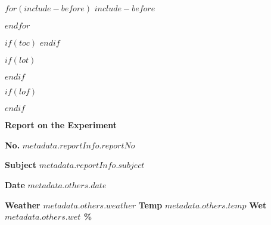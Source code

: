 \documentclass[12pt,a4paper,$if(lang)$$babel-lang$,$endif$]{ltjsarticle}
\begin{document}

$for(include-before)$
$include-before$

$endfor$

$if(toc)$
{
\hypersetup{linkcolor=$if(toccolor)$$toccolor$$else$black$endif$}
\setcounter{tocdepth}{$toc-depth$}
\tableofcontents
}
$endif$

$if(lot)$
\listoftables
$endif$

$if(lof)$
\listoffigures
$endif$

\newenvironment{boldtabular}{ \arrayrulewidth = 2pt }{}
\newenvironment{narrowtabular}{ \renewcommand{\arraystretch}{0.8} }{}
\newenvironment{titletabular}{ \renewcommand{\arraystretch}{1.1} }{}
\newenvironment{datetabular}{ \renewcommand{\arraystretch}{1.1} }{}
\newenvironment{templaturetabular}{ \renewcommand{\arraystretch}{1.18} }{}
\newenvironment{report-title}{
\centering
  \fontsize{20pt}{20pt}\selectfont
}{}
\fontsize{14pt}{28pt}\selectfont

\begin{center}
  \begin{report-title}
    \textbf{Report on the Experiment}
  \end{report-title}

  \vspace{10mm}

  \textbf{No.} \textbf{$metadata.reportInfo.reportNo$}\\

  \vspace{10mm}

  \textbf{Subject} \textbf{$metadata.reportInfo.subject$}\\

  \vspace{10mm}

  \textbf{Date} \textbf{$metadata.others.date$}\\

  \vspace{10mm}

  \textbf{Weather} \textbf{    $metadata.others.weather$    }
  \textbf{Temp} \textbf{    $metadata.others.temp$ \celsius    }
  \textbf{Wet} \textbf{    $metadata.others.wet$ \%    }
\end{center}
\end{document}
